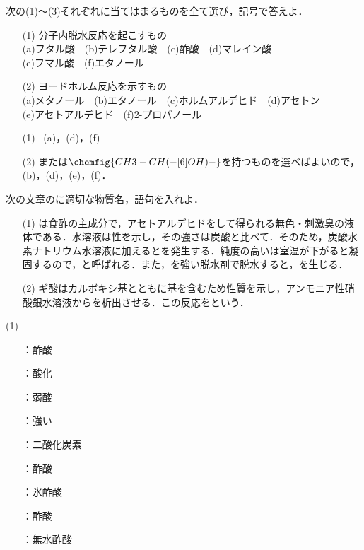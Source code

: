 \documentclass[a4paper,12pt]{ltjsreport}
\begin{document}
\newpage
\begin{que}
次の(1)〜(3)それぞれに当てはまるものを全て選び，記号で答えよ．
\begin{itemize}
    \item [(1)]分子内脱水反応を起こすもの\\
    (a)フタル酸　(b)テレフタル酸　(c)酢酸　(d)マレイン酸　\\(e)フマル酸　(f)エタノール
    \item[(2)]ヨードホルム反応を示すもの\\
     (a)メタノール　(b)エタノール　(c)ホルムアルデヒド　(d)アセトン\\
     (e)アセトアルデヒド　(f)2-プロパノール
\end{itemize}
\end{que}
\ans 
\begin{itemize}
    \item [(1)]~(a)，(d)，(f)　\\[20pt]
    \item [(2)]または$\chemfig{CH3-CH(-[6]OH)-}$を持つものを選べばよいので，(b)，(d)，(e)，(f)．
\end{itemize}
\newpage
\begin{que}
次の文章の\fbox{　}に適切な物質名，語句を入れよ．
\begin{itemize}
    \item[(1)] は食酢の主成分で，アセトアルデヒドをして得られる無色・刺激臭の液体である．水溶液は性を示し，その強さは炭酸と比べて．そのため，炭酸水素ナトリウム水溶液に加えるとを発生する．純度の高いは室温が下がると凝固するので，と呼ばれる．また，を強い脱水剤で脱水すると，を生じる．
    \item [(2)]ギ酸はカルボキシ基とともに基を含むため性質を示し，アンモニア性硝酸銀水溶液からを析出させる．この反応をという．
\end{itemize}
\end{que}
\ans 
\begin{minipage}{0.5\linewidth}
\noindent (1)\begin{itemize}
   \item [\fbox{ア}]：酢酸\\
  \item [\fbox{イ}]：酸化\\
  \item [\fbox{ウ}]：弱酸\\
  \item [\fbox{エ}]：強い\\
  \item [\fbox{オ}]：二酸化炭素\\
  \item [\fbox{カ}]：酢酸\\
  \item [\fbox{キ}]：氷酢酸\\
  \item [\fbox{ク}]：酢酸\\
  \item [\fbox{ケ}]：無水酢酸
\end{itemize}
\end{minipage}
\end{document}
